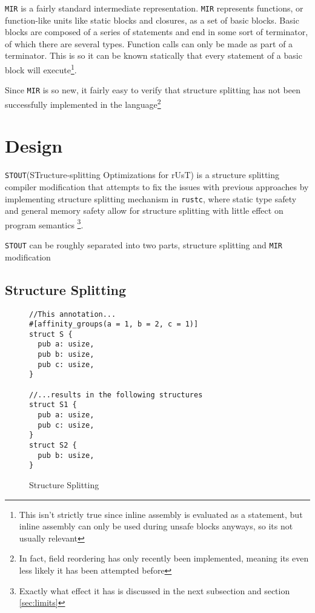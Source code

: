 \documentclass[prodmode,acmtecs]{acmsmall} %
\newcommand{\rustcname}{{\texttt{rustc}}}
\def \rustc {\rustcname{}\xspace}
\newcommand{\mirname}{{\texttt{MIR}}}
\def \mir {\mirname{}\xspace}
\newcommand{\projectname}{{\texttt{STOUT}}}
\def \name{\projectname\xspace}
\begin{document}
\mir is a fairly standard intermediate representation. \mir represents functions, 
or function-like units like static blocks and closures, 
as a set of basic blocks. Basic blocks are composed of a series of statements
and end in some sort of terminator, of which there are several types. 
Function calls can only be made as part of a terminator. This is
so it can be known statically that every statement of a basic block will
execute\footnote{This isn't strictly true since inline assembly is evaluated as
  a statement, but inline assembly can only be used during unsafe blocks
  anyways, so its not usually relevant}.

  Since \mir is so new, it fairly easy to verify that structure splitting has
  not been successfully implemented in the language\footnote{In fact, field
  reordering has only recently been implemented, meaning its even less
  likely it has been attempted before}

\section{Design}

\name (STructure-splitting Optimizations for rUsT) is a structure 
splitting compiler modification that attempts to fix the issues with
previous approaches by implementing structure splitting 
mechanism in \rustc, where static type
safety and general memory safety allow for 
structure splitting with little effect on program
semantics
\footnote{Exactly what effect it has is discussed in the next subsection and section \ref{sec:limits}}.

\name can be roughly separated into 
two parts, 
structure splitting
and \mir modification

\subsection{Structure Splitting}

\begin{figure}[h]
\begin{verbatim}
//This annotation...
#[affinity_groups(a = 1, b = 2, c = 1)]
struct S {
  pub a: usize,
  pub b: usize,
  pub c: usize,
}

//...results in the following structures
struct S1 {
  pub a: usize,
  pub c: usize,
}
struct S2 {
  pub b: usize,
}
\end{verbatim}
  \caption{Structure Splitting}
  \label{fig:split}
\end{figure}
\end{document}
